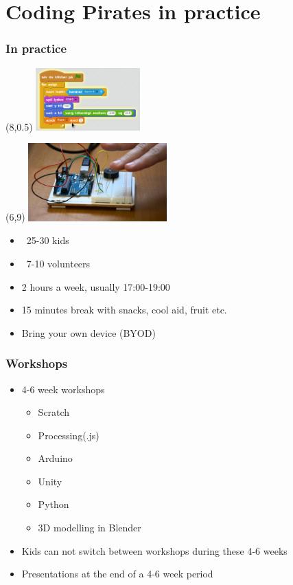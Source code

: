 \documentclass{beamer}
\begin{document}
\section{Coding Pirates in practice}
\begin{frame}
\frametitle{In practice}

\begin{textblock}{20}(8,0.5)
 \includegraphics[width=0.3\textwidth]{imagery/scratch}
\end{textblock}

\begin{textblock}{20}(6,9)
  \includegraphics[width=0.4\textwidth]{imagery/arduino-theremin}
\end{textblock}

\begin{itemize}
\item ~25-30 kids
\item ~7-10 volunteers
\item 2 hours a week, usually 17:00-19:00
\item 15 minutes break with snacks, cool aid, fruit etc.
\item Bring your own device (BYOD)
\end{itemize}
\vspace{2cm}

\end{frame}

\begin{frame}
\frametitle{Workshops}

\begin{itemize}
\item 4-6 week workshops
  \begin{itemize}
  \item Scratch
  \item Processing(.js)
  \item Arduino
  \item Unity
  \item Python
  \item 3D modelling in Blender
  \end{itemize}
\item Kids can not switch between workshops during these 4-6 weeks
\item Presentations at the end of a 4-6 week period
\end{itemize}


\end{frame}
\end{document}
